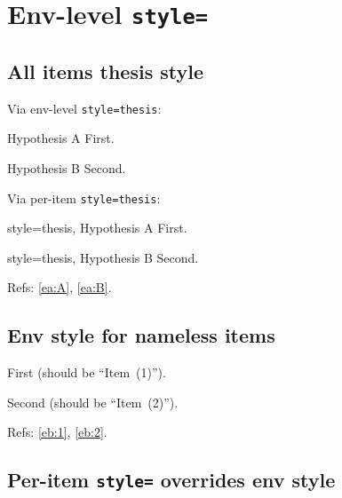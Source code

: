 \documentclass{article}
\begin{document}
\section{Env-level \texttt{style=}}


\subsection{All items thesis style}


Via env-level \texttt{style=thesis}:
\begin{prop}[style=thesis]
  \item[Hypothesis A] First. \label{ea:A}
  \item[Hypothesis B] Second. \label{ea:B}
\end{prop}

Via per-item \texttt{style=thesis}:
\begin{prop}
  \item[style=thesis, Hypothesis A] First.
  \item[style=thesis, Hypothesis B] Second.
\end{prop}

Refs: \ref{ea:A}, \ref{ea:B}.

\subsection{Env style for nameless items}


\begin{prop}[style=widelevelone]
  \item First (should be ``Item~(1)'').     \label{eb:1}
  \item Second (should be ``Item~(2)'').    \label{eb:2}
\end{prop}

Refs: \ref{eb:1}, \ref{eb:2}.

\subsection{Per-item \texttt{style=} overrides env style}
\end{document}
